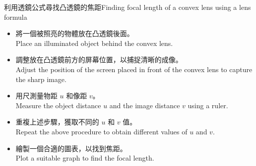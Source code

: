 \documentclass[beamer=true]{standalone}
\begin{document}
\begin{frame}{利用透鏡公式尋找凸透鏡的焦距Finding focal length of a convex lens using a lens formula}
    \begin{itemize}
        \item 將一個被照亮的物體放在凸透鏡後面。\\Place an illuminated object behind the convex lens.
        \item 調整放在凸透鏡前方的屏幕位置，以捕捉清晰的成像。\\Adjust the position of the screen placed in front of the convex lens to capture the sharp image.
        \item 用尺測量物距 $u$ 和像距 $v$。\\Measure the object distance $u$ and the image distance $v$ using a ruler.
        \item 重複上述步驟，獲取不同的 $u$ 和 $v$ 值。\\Repeat the above procedure to obtain different values of $u$ and $v$.
        \item 繪製一個合適的圖表，以找到焦距。\\Plot a suitable graph to find the focal length.
    \end{itemize}
\end{frame}
\end{document}
